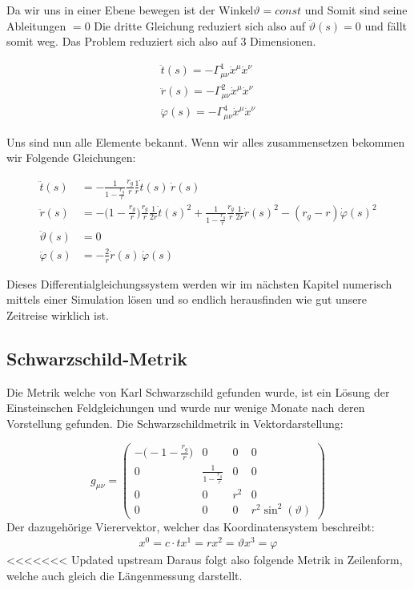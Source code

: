 \begin{refsection}
	Da wir uns in einer Ebene bewegen ist der Winkel$\vartheta = const$ und Somit sind seine Ableitungen $=0$ Die dritte Gleichung reduziert sich also auf $\ddot{\vartheta}(s)=0$ und fällt somit weg. Das Problem reduziert sich also auf 3 Dimensionen.
	
	\begin{align*}
	\ddot{t}(s) = -\Gamma^{1}_{\mu\nu}\dot{x}^{\mu}\dot{x}^{\nu}\\
	\ddot{r}(s) = -\Gamma^{2}_{\mu\nu}\dot{x}^{\mu}\dot{x}^{\nu}\\
	\ddot{\varphi}(s) = -\Gamma^{4}_{\mu\nu}\dot{x}^{\mu}\dot{x}^{\nu}		
	\end{align*}
	
	Uns sind nun alle Elemente bekannt. Wenn wir alles zusammensetzen bekommen wir Folgende Gleichungen:
	
	\begin{align*}
	\ddot t(s)
	&=
	-\frac{1}{1-\displaystyle\frac{r_g}{r}}\frac{r_g}{r}\frac{1}{r}\dot t(s)\,\dot r(s)
	\\
	\ddot r(s)
	&=
	-\biggl(1-\frac{r_g}{r}\biggr)\frac{r_g}{r}\frac1{2r}\dot t(s)^2
	+\frac{1}{1-\displaystyle\frac{r_g}{r}} \frac{r_g}{r}\frac1{2r}\dot r(s)^2
	- (r_g-r) \dot\varphi(s)^2
	\\
	\ddot \vartheta(s)
	&=
	0
	\\
	\ddot \varphi(s)
	&=
	-\frac2r \dot r(s)\,\dot\varphi(s)
	\end{align*}
	
	Dieses Differentialgleichungssystem werden wir im nächsten Kapitel numerisch mittels einer Simulation lösen und so endlich herausfinden wie gut unsere Zeitreise wirklich ist. 
	
	\subsection{Schwarzschild-Metrik}
	
	Die Metrik welche von Karl Schwarzschild gefunden wurde, ist ein Lösung der Einsteinschen Feldgleichungen und wurde nur wenige Monate nach deren Vorstellung gefunden.
	Die Schwarzschildmetrik in Vektordarstellung:
	
	\begin{equation}
	g_{\mu\nu}=
	\begin{pmatrix}
	-\biggl(-1-\frac{r_{g}}{r}\biggr) & 0 & 0 & 0 \\
	0 & \frac{1}{\displaystyle1-\frac{r_{g}}{r}} & 0 & 0 \\
	0 & 0 & r^{2} & 0 \\
	0 & 0 & 0 & r^{2}\sin^{2}(\vartheta)
	\end{pmatrix}
	\end{equation}
	Der dazugehörige Vierervektor, welcher das Koordinatensystem beschreibt:
	\begin{align*}
	x^{0}=c\cdot t
	x^{1}=r
	x^{2}=\vartheta
	x^{3}=\varphi
	\end{align*}
<<<<<<< Updated upstream
	Daraus folgt also folgende Metrik in Zeilenform, welche auch gleich die Längenmessung darstellt.
	

\end{refsection}
